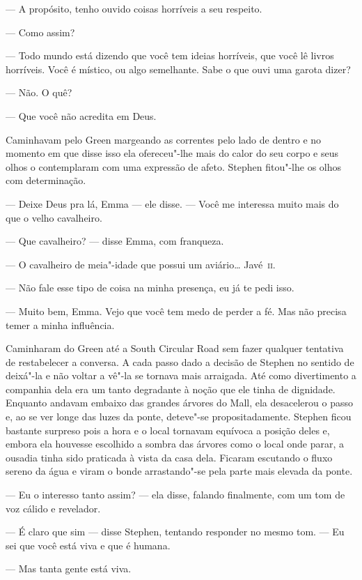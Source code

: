 --- A propósito, tenho ouvido coisas horríveis a seu respeito.

--- Como assim?

--- Todo mundo está dizendo que você tem ideias horríveis, que você lê livros
horríveis.  Você é místico, ou algo semelhante.  Sabe o que ouvi uma garota
dizer?

--- Não.  O quê?

--- Que você não acredita em Deus.

Caminhavam pelo Green margeando as correntes pelo lado de dentro e no momento
em que disse isso ela ofereceu"-lhe mais do calor do seu corpo e seus olhos o
contemplaram com uma expressão de afeto.  Stephen fitou"-lhe os olhos com
determinação.

--- Deixe Deus pra lá, Emma --- ele disse.  --- Você me interessa muito mais
do que o velho cavalheiro.

--- Que cavalheiro? --- disse Emma, com franqueza.

--- O cavalheiro de meia"-idade que possui um aviário\ldots{} \mbox{Javé \textsc{ii}}.

--- Não fale esse tipo de coisa na minha presença, eu já te pedi isso.

--- Muito bem, Emma.  Vejo que você tem medo de perder a fé.  Mas não precisa
temer a minha influência.

Caminharam do Green até a South Circular Road sem fazer qualquer tentativa de
restabelecer a conversa.  A cada passo dado a decisão de Stephen no sentido de
deixá"-la e não voltar a vê"-la se tornava mais arraigada.  Até como divertimento
a companhia dela era um tanto degradante à noção que ele tinha de dignidade.
Enquanto andavam embaixo das grandes árvores do Mall, ela desacelerou o passo
e, ao se ver longe das luzes da ponte, deteve"-se propositadamente.  Stephen
ficou bastante surpreso pois a hora e o local tornavam equívoca a posição deles
e, embora ela houvesse escolhido a sombra das árvores como o local onde parar, a
ousadia tinha sido praticada à vista da casa dela.  Ficaram escutando o fluxo
sereno da água e viram o bonde arrastando"-se pela parte mais elevada da ponte.

--- Eu o interesso tanto assim? --- ela disse, falando finalmente, com um tom
de voz cálido e revelador.

--- É claro que sim --- disse Stephen, tentando responder no mesmo tom.  --- Eu
sei que você está viva e que é humana.

--- Mas tanta gente está viva.

